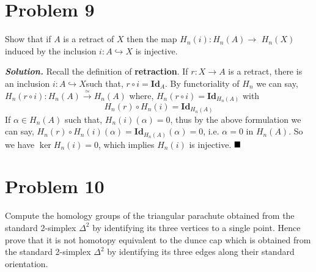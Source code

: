 \documentclass[11pt]{article}
\newcommand{\sol}{ \textbf{\textit{Solution.}} }
\begin{document}
 \section{Problem 9}

 \begin{prob}{}{}
     Show that if $A$ is a retract of $X$ then the map $H_{n}(i): H_{n}(A) \rightarrow$ $H_{n}(X)$ induced by the inclusion $i: A \hookrightarrow X$ is injective.
 \end{prob}

 \sol Recall the definition of \textbf{retraction}. If \(r : X \to A\) is a retract, there is an inclusion \(i : A \hookrightarrow X\)such that, \(r \circ i = \mathbf{Id}_A\). By functoriality of \(H_n\) we can say, \(H_n(r \circ i): H_n(A) \xrightarrow{\simeq} H_n(A)\) where, \(H_n(r \circ i) = \mathbf{Id}_{H_n(A)}\) with 
 \[H_n(r) \circ H_n(i) = \mathbf{Id}_{H_n(A)}\]
If $\alpha \in H_n(A)$ such that, $H_n(i)(\alpha)=0$, thus by the above formulation we can say, $H_n(r) \circ H_n(i)(\alpha) = \mathbf{Id}_{H_n(A)}(\alpha) = 0$, i.e. $\alpha = 0$ in $H_n(A)$. So we have $\ker H_n(i) = \qty{0}$, which implies $H_n(i)$ is injective. $\hfill \blacksquare$

 \section{Problem 10}

 \begin{prob}{}{}
    Compute the homology groups of the triangular parachute obtained from the standard 2-simplex $\Delta^{2}$ by identifying its three vertices to a single point. Hence prove that it is not homotopy equivalent to the dunce cap which is obtained from the standard 2-simplex $\Delta^{2}$ by identifying its three edges along their standard orientation.
 \end{prob}
 
\end{document}
